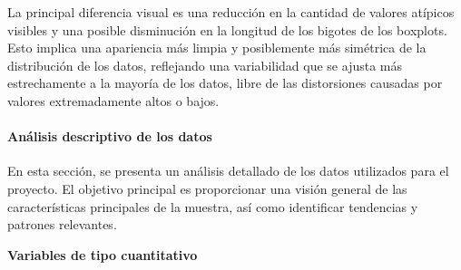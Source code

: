 \documentclass[
  11pt,
  bookmarksnumbered]{article}
\begin{document}
La principal diferencia visual es una reducción en la cantidad de valores atípicos visibles y una posible disminución en la longitud de los bigotes de los boxplots.
Esto implica una apariencia más limpia y posiblemente más simétrica de la distribución de los datos, reflejando una variabilidad que se ajusta más estrechamente a la mayoría de los datos, libre de las distorsiones causadas por valores extremadamente altos o bajos.

\newpage

\hypertarget{anuxe1lisis-descriptivo-de-los-datos}{%
\paragraph{Análisis descriptivo de los datos}\label{anuxe1lisis-descriptivo-de-los-datos}}

En esta sección, se presenta un análisis detallado de los datos utilizados para el proyecto.
El objetivo principal es proporcionar una visión general de las características principales de la muestra, así como identificar tendencias y patrones relevantes.

\textbf{Variables de tipo cuantitativo}
\end{document}
